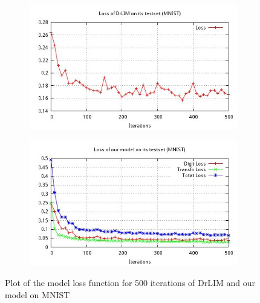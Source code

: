\documentclass[a4paper,12pt]{report}
\begin{document}
\begin{figure}[t!]
    \centering
    \begin{subfigure}[t]{0.45\textwidth}
        \centering
        \includegraphics[width=\textwidth]{thesis_figures/final_loss_testset_2bv7.jpg}
    \end{subfigure}
    \begin{subfigure}[t]{0.45\textwidth}
        \centering
        \includegraphics[width=\textwidth]{thesis_figures/final_loss_testset_3Dc3.jpg}
    \end{subfigure}
    \label{fig:mnist_cl2d_loss}
    \caption{Plot of the model loss function for 500 iterations of DrLIM and our model on MNIST}
\end{figure}
\end{document}
